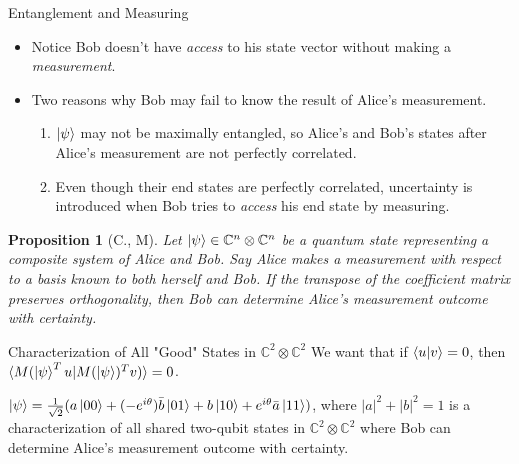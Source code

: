 \documentclass[handout, 10 pt]{beamer}
\newtheorem{prop}{Proposition}
\begin{document}
\begin{frame}{Entanglement and Measuring}
\begin{itemize}
    \item Notice Bob doesn't have {\emph{access}} to his state vector without making a  {\emph{measurement}}.
    \pause
    \item Two reasons why Bob may fail to know the result of Alice's measurement.
    \begin{enumerate}
        \item $\ket{\psi}$ may not be maximally entangled, so Alice's and Bob's states after Alice's measurement are not perfectly correlated.
        \pause
        \item Even though their end states are perfectly correlated, uncertainty is introduced when Bob tries to {\emph{access}} his end state by measuring.
    \end{enumerate}
    
\end{itemize}
\pause

\begin{prop}[C., M]
Let $\ket{\psi} \in \mathbb{C}^n \otimes \mathbb{C}^{n}$ be a quantum state representing a composite system of Alice and Bob. Say Alice makes a measurement with respect to a basis known to both herself and Bob.  If the transpose of the coefficient matrix preserves orthogonality, then Bob can determine Alice's measurement outcome with certainty. 
\end{prop}
\end{frame}

\begin{frame}{Characterization of All "Good" States in $\mathbb{C}^2 \otimes \mathbb{C}^2$}
We want that
if $\braket{u|v}=0$, then $\braket{M(\ket{\psi}^Tu|M(\ket{\psi})^Tv)}=0$.    

\begin{corollary}
$\ket{\psi}=\frac{1}{\sqrt{2}}(a\ket{00}+(-e^{i\theta})\Bar{b}\ket{01}+b\ket{10}+e^{i\theta}\Bar{a}\ket{11})$, where $|a|^2+|b|^2=1$ is a characterization of all shared two-qubit states in $\mathbb{C}^2 \otimes \mathbb{C}^2$ where Bob can determine Alice's measurement outcome with certainty.

\end{corollary}
\end{frame}
\end{document}
